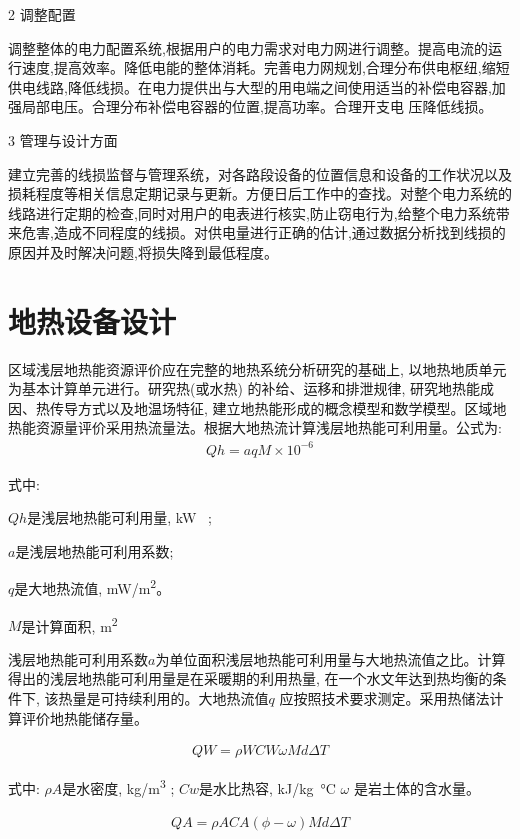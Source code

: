 2 调整配置

调整整体的电力配置系统,根据用户的电力需求对电力网进行调整。提高电流的运行速度,提高效率。降低电能的整体消耗。完善电力网规划,合理分布供电枢纽,缩短供电线路,降低线损。在电力提供出与大型的用电端之间使用适当的补偿电容器,加强局部电压。合理分布补偿电容器的位置,提高功率。合理开支电
压降低线损。

3 管理与设计方面

建立完善的线损监督与管理系统，对各路段设备的位置信息和设备的工作状况以及损耗程度等相关信息定期记录与更新。方便日后工作中的查找。对整个电力系统的线路进行定期的检查,同时对用户的电表进行核实,防止窃电行为,给整个电力系统带来危害,造成不同程度的线损。对供电量进行正确的估计,通过数据分析找到线损的原因并及时解决问题,将损失降到最低程度。

\section{地热设备设计}
\label{sec:energy-geothermal}

区域浅层地热能资源评价应在完整的地热系统分析研究的基础上, 以地热地质单元为基本计算单元进行。研究热(或水热) 的补给、运移和排泄规律, 研究地热能成因、热传导方式以及地温场特征, 建立地热能形成的概念模型和数学模型。区域地热能资源量评价采用热流量法。根据大地热流计算浅层地热能可利用量。公式为:
\begin{align}
  Qh=aqM\times10^{-6}
\end{align}

式中:

$Qh$是浅层地热能可利用量, \si{ kW };

$a$是浅层地热能可利用系数;

$q$是大地热流值, \si{mW/m^2}。

$M$是计算面积, \si{m^2}

浅层地热能可利用系数$a$为单位面积浅层地热能可利用量与大地热流值之比。计算得出的浅层地热能可利用量是在采暖期的利用热量, 在一个水文年达到热均衡的条件下, 该热量是可持续利用的。大地热流值$q$ 应按照技术要求测定。采用热储法计算评价地热能储存量。

\begin{align}
  QW=ρWCW\omega Md\Delta T
\end{align}

式中: $\rho A$是水密度, \si{kg/m^3} ; $Cw$是水比热容, \si{kJ/kg\degreeCelsius} $\omega$ 是岩土体的含水量。

\begin{align}
  QA=\rho ACA(\phi  - \omega)Md\Delta T
\end{align}

